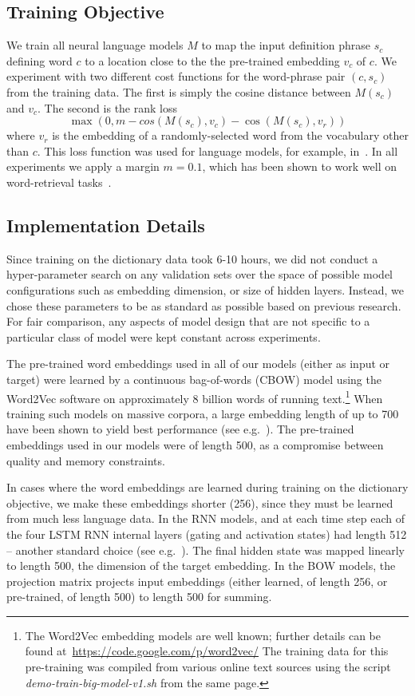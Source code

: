 \subsection{Training Objective}

We train all neural language models \(M\) to map the input definition phrase \(s_c\) defining word \(c\) to a location close to the the pre-trained embedding \(v_c\) of \(c\). We experiment with two different cost functions for the word-phrase pair \((c,s_c)\) from the training data. The first is simply the cosine distance between \(M(s_c)\) and \(v_c\). The second is the rank loss 
\[
\max(0, m - cos(M(s_c),v_c)-\cos(M(s_c),v_r))
\] 
where \(v_r\) is the embedding of a randomly-selected word from the vocabulary other than \(c\). This loss function was used for language models, for example, in~\cite{huang2012improving}. In all experiments we apply a margin \(m = 0.1\), which has been shown to work well on word-retrieval tasks~\cite{bordes2015large}. 

\subsection{Implementation Details}
Since training on the dictionary data took 6-10 hours, we did not conduct a hyper-parameter search on any validation sets over the space of possible model configurations such as embedding dimension, or size of hidden layers. Instead, we chose these parameters to be as standard as possible based on previous research. For fair comparison, any aspects of model design that are not specific to a particular class of model were kept constant across experiments. 

The pre-trained word embeddings used in all of our models (either as input or target) were learned by a continuous bag-of-words (CBOW) model using the Word2Vec software on approximately 8 billion words of running text.\footnote{The Word2Vec embedding models are well known; further details can be found at~\url{https://code.google.com/p/word2vec/} The training data for this pre-training was compiled from various online text sources using the script \emph{demo-train-big-model-v1.sh} from the same page.} When training such models on massive corpora, a large embedding length of up to 700 have been shown to yield best performance (see e.g.~\cite{faruqui2014retrofitting}). The pre-trained embeddings used in our models were of length 500, as a compromise between quality and memory constraints.

In cases where the word embeddings are learned during training on the dictionary objective, we make these embeddings shorter (256), since they must be learned from much less language data. In the RNN models, and at each time step each of the four LSTM RNN internal layers (gating and activation states) had length 512 -- another standard choice (see e.g.~\cite{cho2014learning}). The final hidden state was mapped linearly to length 500, the dimension of the target embedding. In the BOW models, the projection matrix projects input embeddings (either learned, of length 256, or pre-trained, of length 500) to length 500 for summing. 

